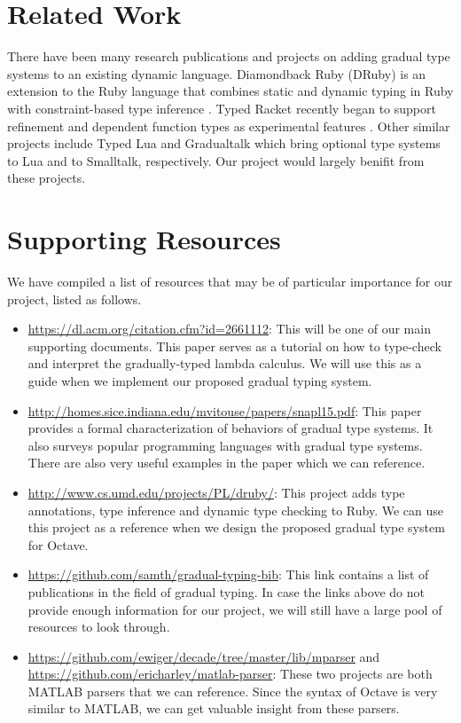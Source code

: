 \section{Related Work}
There have been many research publications and projects on adding gradual type
systems to an existing dynamic language. Diamondback Ruby (DRuby) is an
extension to the Ruby language that combines static and dynamic typing in Ruby
with constraint-based type inference \cite{furr2009combining}. Typed Racket
\cite{tobin2006interlanguage} recently began to support refinement and dependent
function types as experimental features \cite{racket2017refinement}. Other
similar projects include Typed Lua \cite{maidl2014typed} and Gradualtalk
\cite{allende2014gradual} which bring optional type systems to Lua and to
Smalltalk, respectively. Our project would largely benifit from these projects.

\section{Supporting Resources}
\label{sec-supporting-resources}
We have compiled a list of resources that may be of particular importance for
our project, listed as follows.

\begin{itemize}
    \item \url{https://dl.acm.org/citation.cfm?id=2661112}: This will be one of
        our main supporting documents. This paper serves as a tutorial on how to
        type-check and interpret the gradually-typed lambda calculus. We will
        use this as a guide when we implement our proposed gradual typing
        system.
    \item \url{http://homes.sice.indiana.edu/mvitouse/papers/snapl15.pdf}: This
        paper provides a formal characterization of behaviors of gradual type
        systems. It also surveys popular programming languages with gradual type
        systems. There are also very useful examples in the paper which we can
        reference.
    \item \url{http://www.cs.umd.edu/projects/PL/druby/}: This project adds type
        annotations, type inference and dynamic type checking to Ruby. We can
        use this project as a reference when we design the proposed gradual type
        system for Octave.
    \item \url{https://github.com/samth/gradual-typing-bib}: This link contains
        a list of publications in the field of gradual typing. In case the links
        above do not provide enough information for our project, we will still
        have a large pool of resources to look through.
    \item \url{https://github.com/ewiger/decade/tree/master/lib/mparser} and
        \url{https://github.com/ericharley/matlab-parser}: These two projects
        are both MATLAB parsers that we can reference. Since the syntax of
        Octave is very similar to MATLAB, we can get valuable insight from these
        parsers.
\end{itemize}

